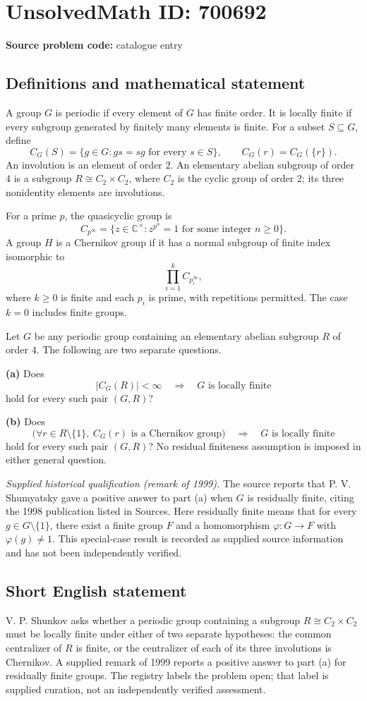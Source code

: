 \documentclass[11pt]{article}
\newcommand{\C}{\mathbb{C}}
\begin{document}
\section*{UnsolvedMath ID: 700692}
\textbf{Source problem code:} catalogue entry
\subsection{Definitions and mathematical statement}
A group \(G\) is periodic if every element of \(G\) has finite order. It is locally finite if every subgroup generated by finitely many elements is finite. For a subset \(S\subseteq G\), define
\[
C_G(S)=\{g\in G:gs=sg\text{ for every }s\in S\},
\qquad C_G(r)=C_G(\{r\}).
\]
An involution is an element of order \(2\). An elementary abelian subgroup of order \(4\) is a subgroup \(R\cong C_2\times C_2\), where \(C_2\) is the cyclic group of order \(2\); its three nonidentity elements are involutions.

For a prime \(p\), the quasicyclic group is
\[
C_{p^\infty}=\{z\in\C^\times:z^{p^n}=1\text{ for some integer }n\geq 0\}.
\]
A group \(H\) is a Chernikov group if it has a normal subgroup of finite index isomorphic to
\[
\prod_{i=1}^{k}C_{p_i^\infty},
\]
where \(k\geq 0\) is finite and each \(p_i\) is prime, with repetitions permitted. The case \(k=0\) includes finite groups.

Let \(G\) be any periodic group containing an elementary abelian subgroup \(R\) of order \(4\). The following are two separate questions.

\textbf{(a)} Does
\[
|C_G(R)|<\infty
\quad\Longrightarrow\quad
G\text{ is locally finite}
\]
hold for every such pair \((G,R)\)?

\textbf{(b)} Does
\[
\bigl(\forall r\in R\setminus\{1\},\ C_G(r)\text{ is a Chernikov group}\bigr)
\quad\Longrightarrow\quad
G\text{ is locally finite}
\]
hold for every such pair \((G,R)\)? No residual finiteness assumption is imposed in either general question.

\textit{Supplied historical qualification (remark of 1999).} The source reports that P. V. Shumyatsky gave a positive answer to part (a) when \(G\) is residually finite, citing the 1998 publication listed in Sources. Here residually finite means that for every \(g\in G\setminus\{1\}\), there exist a finite group \(F\) and a homomorphism \(\varphi:G\to F\) with \(\varphi(g)\neq 1\). This special-case result is recorded as supplied source information and has not been independently verified.
\subsection{Short English statement}
V. P. Shunkov asks whether a periodic group containing a subgroup \(R\cong C_2\times C_2\) must be locally finite under either of two separate hypotheses: the common centralizer of \(R\) is finite, or the centralizer of each of its three involutions is Chernikov. A supplied remark of 1999 reports a positive answer to part (a) for residually finite groups. The registry labels the problem open; that label is supplied curation, not an independently verified assessment.
\end{document}
